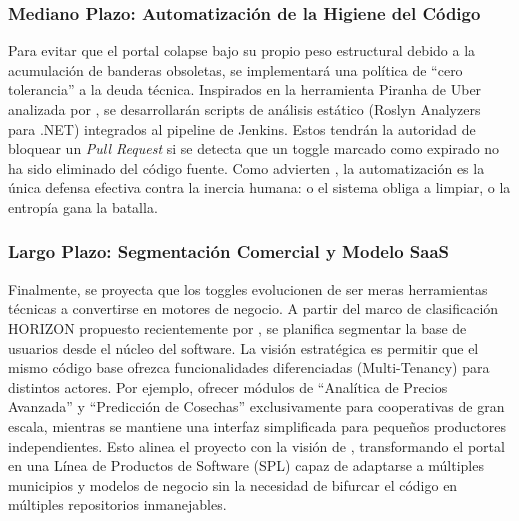 \subsubsection{Mediano Plazo: Automatización de la Higiene del Código}
Para evitar que el portal colapse bajo su propio peso estructural debido a la acumulación de banderas obsoletas, se implementará una política de ``cero tolerancia'' a la deuda técnica. Inspirados en la herramienta Piranha de Uber analizada por \cite{sridharan2020piranha}, se desarrollarán scripts de análisis estático (Roslyn Analyzers para .NET) integrados al pipeline de Jenkins. Estos tendrán la autoridad de bloquear un \textit{Pull Request} si se detecta que un toggle marcado como expirado no ha sido eliminado del código fuente. Como advierten \cite{abdalkareem2021removal}, la automatización es la única defensa efectiva contra la inercia humana: o el sistema obliga a limpiar, o la entropía gana la batalla.

\subsubsection{Largo Plazo: Segmentación Comercial y Modelo SaaS}
Finalmente, se proyecta que los toggles evolucionen de ser meras herramientas técnicas a convertirse en motores de negocio. A partir del marco de clasificación HORIZON propuesto recientemente por \cite{chen2025horizon}, se planifica segmentar la base de usuarios desde el núcleo del software. La visión estratégica es permitir que el mismo código base ofrezca funcionalidades diferenciadas (Multi-Tenancy) para distintos actores. Por ejemplo, ofrecer módulos de ``Analítica de Precios Avanzada'' y ``Predicción de Cosechas'' exclusivamente para cooperativas de gran escala, mientras se mantiene una interfaz simplificada para pequeños productores independientes. Esto alinea el proyecto con la visión de \cite{dupont2022unifying}, transformando el portal en una Línea de Productos de Software (SPL) capaz de adaptarse a múltiples municipios y modelos de negocio sin la necesidad de bifurcar el código en múltiples repositorios inmanejables.
